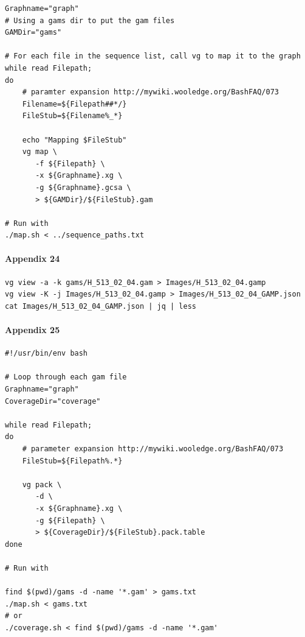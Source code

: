 \documentclass[10pt, a4paper]{article}
\begin{document}
\begin{appendices}
\begin{verbatim}
Graphname="graph"
# Using a gams dir to put the gam files
GAMDir="gams"

# For each file in the sequence list, call vg to map it to the graph
while read Filepath;
do
    # paramter expansion http://mywiki.wooledge.org/BashFAQ/073
    Filename=${Filepath##*/}
    FileStub=${Filename%_*}

    echo "Mapping $FileStub"
    vg map \
       -f ${Filepath} \
       -x ${Graphname}.xg \
       -g ${Graphname}.gcsa \
       > ${GAMDir}/${FileStub}.gam

# Run with
./map.sh < ../sequence_paths.txt
\end{verbatim}

\paragraph{Appendix 24}
\label{sec:org22a4ae6}
\begin{verbatim}
vg view -a -k gams/H_513_02_04.gam > Images/H_513_02_04.gamp
vg view -K -j Images/H_513_02_04.gamp > Images/H_513_02_04_GAMP.json
cat Images/H_513_02_04_GAMP.json | jq | less
\end{verbatim}

\paragraph{Appendix 25}
\label{sec:org4ed252f}
\begin{verbatim}
#!/usr/bin/env bash

# Loop through each gam file
Graphname="graph"
CoverageDir="coverage"

while read Filepath;
do
    # parameter expansion http://mywiki.wooledge.org/BashFAQ/073
    FileStub=${Filepath%.*}

    vg pack \
       -d \
       -x ${Graphname}.xg \
       -g ${Filepath} \
       > ${CoverageDir}/${FileStub}.pack.table
done

# Run with

find $(pwd)/gams -d -name '*.gam' > gams.txt
./map.sh < gams.txt
# or
./coverage.sh < find $(pwd)/gams -d -name '*.gam'
\end{verbatim}

\end{appendices}
\end{document}
